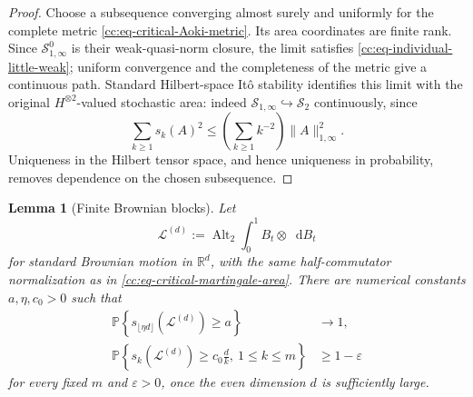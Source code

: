 \documentclass[10pt,reqno]{amsart}
\theoremstyle{plain}
\newtheorem{lemma}[theorem]{Lemma}
\theoremstyle{definition}
\theoremstyle{remark}
\begin{document}
\begin{proof}
Choose a subsequence converging almost surely and uniformly for the
complete metric \eqref{cc:eq-critical-Aoki-metric}.  Its area coordinates
are finite rank.  Since
\(\mathcal S^0_{1,\infty}\) is their weak-quasi-norm closure, the limit
satisfies \eqref{cc:eq-individual-little-weak}; uniform convergence and
the completeness of the metric give a continuous path.  Standard
Hilbert-space It\^o stability identifies this limit with the original
\(H^{\otimes2}\)-valued stochastic area: indeed
\(\mathcal S_{1,\infty}\hookrightarrow\mathcal S_2\) continuously, since
\[
 \sum_{k\geq1}s_k(A)^2
 \leq\left(\sum_{k\geq1}k^{-2}\right)\|A\|_{1,\infty}^2.
\]
Uniqueness in the Hilbert tensor space, and hence uniqueness in
probability, removes dependence on the chosen subsequence.
\end{proof}

\begin{lemma}[Finite Brownian blocks]
\label{cc:lem-critical-brownian-block}
Let
\[
 \mathcal L^{(d)}
 :=\operatorname{Alt}_2\int_0^1B_t\otimes\mathop{}\!\mathrm dB_t
\]
for standard Brownian motion in \(\mathbb R^d\), with the same
half-commutator normalization as in
\eqref{cc:eq-critical-martingale-area}.  There are numerical constants
\(a,\eta,c_0>0\) such that
\begin{align}
 \mathbb P\left\{s_{\lfloor\eta d\rfloor}
       (\mathcal L^{(d)})\geq a\right\}&\longrightarrow1,
 \label{cc:eq-critical-Brownian-bulk}\\
 \mathbb P\left\{s_k(\mathcal L^{(d)})
       \geq c_0\frac d k,\ 1\leq k\leq m\right\}
 &\geq1-\varepsilon
 \label{cc:eq-critical-Brownian-edge}
\end{align}
for every fixed \(m\) and \(\varepsilon>0\), once the even dimension \(d\)
is sufficiently large.
\end{lemma}
\end{document}
